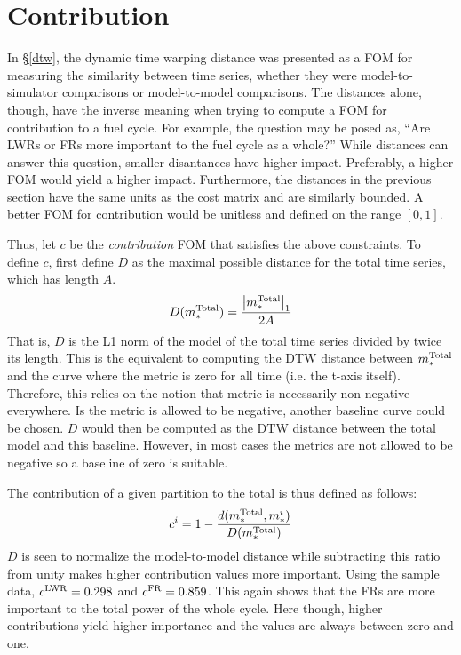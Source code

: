 \clearpage
\section{Contribution}
\label{contribution}

In \S\ref{dtw}, the dynamic time warping distance was presented as a 
FOM for measuring the similarity between time series, whether they 
were model-to-simulator comparisons or model-to-model comparisons.
The distances alone, though, have the inverse meaning when trying to 
compute a FOM for contribution to a fuel cycle.  For example, the 
question may be posed as, ``Are LWRs or FRs more important to the fuel 
cycle as a whole?'' While distances can answer this question, smaller 
disantances have higher impact. Preferably, a higher FOM would yield a 
higher impact. Furthermore, the distances in the previous section have
the same units as the cost matrix and are similarly bounded. A better 
FOM for contribution would be unitless and defined on the range $[0,1]$.

Thus, let $c$ be the \emph{contribution} FOM that satisfies the above 
constraints. To define $c$, first define $D$ as the maximal possible 
distance for the total time series, which has length $A$.
\begin{equation}
\label{D-def}
D(m_*^{\mathrm{Total}}) = \frac{\left|m_*^{\mathrm{Total}}\right|_1}{2A}
\end{equation}
That is, $D$ is the L1 norm of the model of the total time series divided
by twice its length. This is the equivalent to computing the DTW distance
between $m_*^{\mathrm{Total}}$ and the curve where the metric is zero for all time 
(i.e. the t-axis itself).  Therefore, this relies on the notion that 
metric is necessarily non-negative everywhere.  Is the metric is allowed to 
be negative, another baseline curve could be chosen. $D$ would then be 
computed as the DTW distance between the total model and this baseline.
However, in most cases the metrics are not allowed to be negative so 
a baseline of zero is suitable.

The contribution of a given partition to the total is thus defined as follows:
\begin{equation}
\label{cont}
c^i = 1 - \frac{d(m_*^{\mathrm{Total}}, m_*^i)}{D(m_*^{\mathrm{Total}})}
\end{equation}
$D$ is seen to normalize the model-to-model distance while subtracting this
ratio from unity makes higher contribution values more important.  
Using the sample data, $c^{\mathrm{LWR}} = 0.298$ and $c^{\mathrm{FR}} = 0.859$. This again shows
that the FRs are more important to the total power of the whole cycle.
Here though, higher contributions yield higher importance and the values
are always between zero and one.

